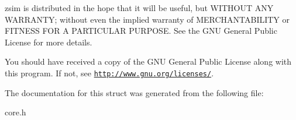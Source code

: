 zsim is distributed in the hope that it will be useful, but W\-I\-T\-H\-O\-U\-T A\-N\-Y W\-A\-R\-R\-A\-N\-T\-Y; without even the implied warranty of M\-E\-R\-C\-H\-A\-N\-T\-A\-B\-I\-L\-I\-T\-Y or F\-I\-T\-N\-E\-S\-S F\-O\-R A P\-A\-R\-T\-I\-C\-U\-L\-A\-R P\-U\-R\-P\-O\-S\-E. See the G\-N\-U General Public License for more details.

You should have received a copy of the G\-N\-U General Public License along with this program. If not, see \href{http://www.gnu.org/licenses/}{\tt http\-://www.\-gnu.\-org/licenses/}. 

The documentation for this struct was generated from the following file\-:\begin{DoxyCompactItemize}
\item 
core.\-h\end{DoxyCompactItemize}
